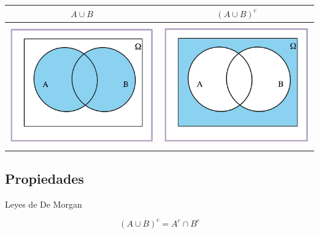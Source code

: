 \documentclass[]{book}
\begin{document}
\begin{longtable}[]{@{}cc@{}}
\toprule
\(A\cup B\) & \((A\cup B)^c\)\tabularnewline
\midrule
\endhead
\includegraphics[width=\textwidth,height=2.08333in]{Images/proba1dibujos/demorgan6.jpg} & \includegraphics[width=\textwidth,height=2.08333in]{Images/proba1dibujos/demorgan7.jpg}\tabularnewline
\bottomrule
\end{longtable}

\hypertarget{propiedades-5}{%
\subsection{Propiedades}\label{propiedades-5}}

Leyes de De Morgan

\[(A\cup B)^c=A^c\cap B^c\]
\end{document}
